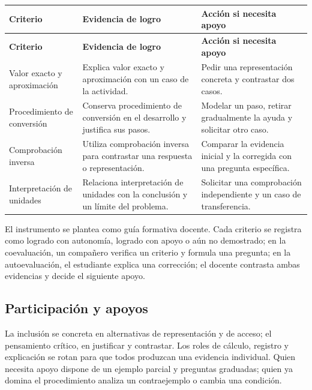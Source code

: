 \documentclass[spanish,letterpaper,oneside]{article}
\begin{document}
{\small{}\renewcommand{\arraystretch}{1.25}
\begin{longtable}{|>{\raggedright\arraybackslash}p{}|>{\raggedright\arraybackslash}p{}|>{\raggedright\arraybackslash}p{}|}\hline
\rowcolor{iiiepePale} \textbf{Criterio} & \textbf{Evidencia de logro} & \textbf{Acción si necesita apoyo} \\\hline
\endfirsthead
\hline
\rowcolor{iiiepePale} \textbf{Criterio} & \textbf{Evidencia de logro} & \textbf{Acción si necesita apoyo} \\\hline
\endhead
Valor exacto y aproximación & Explica valor exacto y aproximación con un caso de la actividad. & Pedir una representación concreta y contrastar dos casos. \\\hline
Procedimiento de conversión & Conserva procedimiento de conversión en el desarrollo y justifica sus pasos. & Modelar un paso, retirar gradualmente la ayuda y solicitar otro caso. \\\hline
Comprobación inversa & Utiliza comprobación inversa para contrastar una respuesta o representación. & Comparar la evidencia inicial y la corregida con una pregunta específica. \\\hline
Interpretación de unidades & Relaciona interpretación de unidades con la conclusión y un límite del problema. & Solicitar una comprobación independiente y un caso de transferencia. \\\hline
\end{longtable}}
El instrumento se plantea como guía formativa docente. Cada criterio se registra como logrado con autonomía, logrado con apoyo o aún no demostrado; en la coevaluación, un compañero verifica un criterio y formula una pregunta; en la autoevaluación, el estudiante explica una corrección; el docente contrasta ambas evidencias y decide el siguiente apoyo.\subsection{Participación y apoyos}
La inclusión se concreta en alternativas de representación y de acceso; el pensamiento crítico, en justificar y contrastar. Los roles de cálculo, registro y explicación se rotan para que todos produzcan una evidencia individual. Quien necesita apoyo dispone de un ejemplo parcial y preguntas graduadas; quien ya domina el procedimiento analiza un contraejemplo o cambia una condición.
\end{document}
